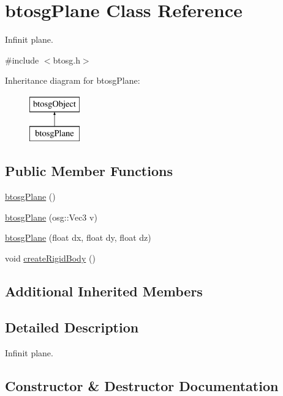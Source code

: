 \hypertarget{classbtosgPlane}{}\section{btosg\+Plane Class Reference}
\label{classbtosgPlane}


Infinit plane.  




{\ttfamily \#include $<$btosg.\+h$>$}

Inheritance diagram for btosg\+Plane\+:\begin{figure}[H]
\begin{center}
\leavevmode
\includegraphics[height=2.000000cm]{classbtosgPlane}
\end{center}
\end{figure}
\subsection*{Public Member Functions}
\begin{DoxyCompactItemize}
\item 
\hyperlink{classbtosgPlane_a363737cea03a886470a1a46003706268}{btosg\+Plane} ()
\item 
\hyperlink{classbtosgPlane_a4bc8b74d62426eb5fa66355b71569db2}{btosg\+Plane} (osg\+::\+Vec3 v)
\item 
\hyperlink{classbtosgPlane_a295ebe4cb55a2786764c7840d10895f4}{btosg\+Plane} (float dx, float dy, float dz)
\item 
void \hyperlink{classbtosgPlane_a0e6812c186ed1fa128dccf7cd2e525a6}{create\+Rigid\+Body} ()
\end{DoxyCompactItemize}
\subsection*{Additional Inherited Members}


\subsection{Detailed Description}
Infinit plane. 

\subsection{Constructor \& Destructor Documentation}
\mbox{\label{classbtosgPlane_a363737cea03a886470a1a46003706268}} 
